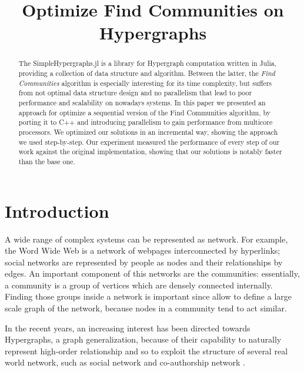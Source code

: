 \documentclass[conference]{IEEEtran}
\newcommand{\mypar}[1]{{\bf #1.}}
\begin{document}
\title{Optimize Find Communities on Hypergraphs}


\author{
}

\maketitle

\begin{abstract}
The SimpleHypergraphs.jl is a library for Hypergraph computation written in Julia, providing a collection of data structure and algorithm. Between the latter, the \textit{Find Communities} algorithm is especially interesting for its time complexity, but suffers from not optimal data structure design and no parallelism that lead to poor performance and scalability on nowadays systems.  
In this paper we presented an approach for optimize a sequential version of the Find Communities algorithm, by porting it to C++ and introducing parallelism to gain performance from multicore processors. We optimized our solutions in an incremental way, showing the approach we used step-by-step. Our experiment measured the performance of every step of our work against the original implementation, showing that our solutions is notably faster than the base one.
\end{abstract}

\section{Introduction}\label{sec:intro}

A wide range of complex systems can be represented as network. For example, the Word Wide Web is a network of webpages interconnected by hyperlinks; social networks are represented by people as nodes and their relationships by edges. An important component of this networks are the communities: essentially, a community is a group of vertices which are densely connected internally. Finding those groups inside a network is important since allow to define a large scale graph of the network, because nodes in a community tend to act similar.\cite{find_community_eigenvectors}

In the recent years, an increasing interest has been directed towards Hypergraphs, a graph generalization, because of their capability to naturally represent high-order relationship and so to exploit the structure of several real world network, such as social network and co-authorship network \cite{Hg_introduction}.
\end{document}

